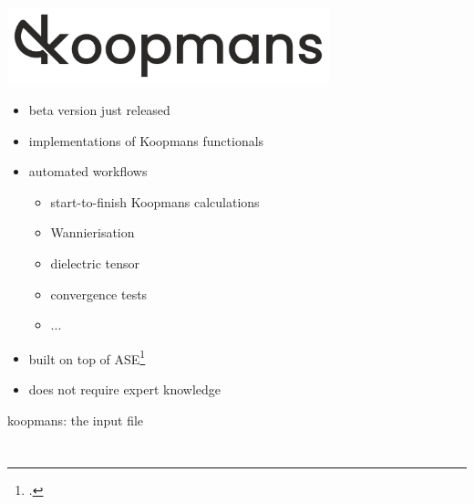 \documentclass[xcolor=table,aspectratio=169]{beamer}
\numberwithin{equation}{section}
\begin{document}
\begin{frame}{}
   \begin{center}
      \includegraphics[width=0.7\textwidth]{figures/koopmans_grey_on_transparent.png}
   \end{center}

   \begin{itemize}
      \item beta version just released
      \item implementations of Koopmans functionals
      \item automated workflows
            \begin{itemize}
               \item start-to-finish Koopmans calculations
               \item Wannierisation
               \item dielectric tensor
               \item convergence tests
               \item ...
            \end{itemize}
      \item built on top of ASE\footcite{Larsen2017}
      \item does not require expert knowledge
   \end{itemize}
\end{frame}

\begin{frame}{koopmans: the input file}
   \begin{minipage}[t]{0.475\columnwidth}
      \inputminted[fontsize=\tiny,breaklines,lastline=20]{json}{scripts/si.json}
   \end{minipage}
   \hspace{0.025\textwidth}
   \begin{minipage}[t]{0.475\columnwidth}
      \inputminted[fontsize=\tiny,breaklines,firstline=21]{json}{scripts/si.json}
   \end{minipage}
\end{frame}

\end{document}
